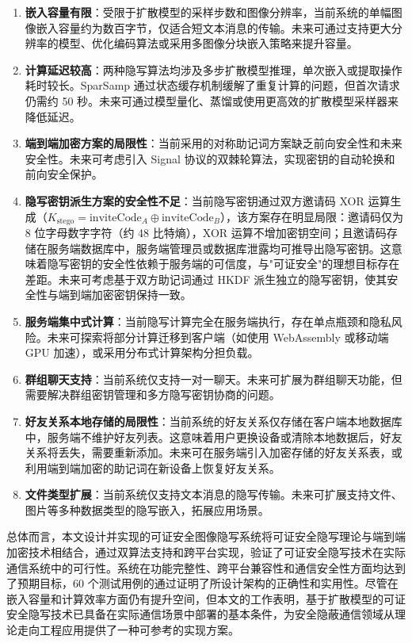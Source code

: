 \begin{enumerate}
    \item \textbf{嵌入容量有限}：受限于扩散模型的采样步数和图像分辨率，当前系统的单幅图像嵌入容量约为数百字节，仅适合短文本消息的传输。未来可通过支持更大分辨率的模型、优化编码算法或采用多图像分块嵌入策略来提升容量。

    \item \textbf{计算延迟较高}：两种隐写算法均涉及多步扩散模型推理，单次嵌入或提取操作耗时较长。SparSamp 通过状态缓存机制缓解了重复计算的问题，但首次请求仍需约 50 秒。未来可通过模型量化、蒸馏或使用更高效的扩散模型采样器来降低延迟。

    \item \textbf{端到端加密方案的局限性}：当前采用的对称助记词方案缺乏前向安全性和未来安全性。未来可考虑引入 Signal 协议的双棘轮算法，实现密钥的自动轮换和前向安全保护。

    \item \textbf{隐写密钥派生方案的安全性不足}：当前隐写密钥通过双方邀请码 XOR 运算生成（$K_{\text{stego}} = \text{inviteCode}_A \oplus \text{inviteCode}_B$），该方案存在明显局限：邀请码仅为 8 位字母数字字符（约 48 比特熵），XOR 运算不增加密钥空间；且邀请码存储在服务端数据库中，服务端管理员或数据库泄露均可推导出隐写密钥。这意味着隐写密钥的安全性依赖于服务端的可信度，与"可证安全"的理想目标存在差距。未来可考虑基于双方助记词通过 HKDF 派生独立的隐写密钥，使其安全性与端到端加密密钥保持一致。

    \item \textbf{服务端集中式计算}：当前隐写计算完全在服务端执行，存在单点瓶颈和隐私风险。未来可探索将部分计算迁移到客户端（如使用 WebAssembly 或移动端 GPU 加速），或采用分布式计算架构分担负载。

    \item \textbf{群组聊天支持}：当前系统仅支持一对一聊天。未来可扩展为群组聊天功能，但需要解决群组密钥管理和多方隐写密钥协商的问题。

    \item \textbf{好友关系本地存储的局限性}：当前系统的好友关系仅存储在客户端本地数据库中，服务端不维护好友列表。这意味着用户更换设备或清除本地数据后，好友关系将丢失，需要重新添加。未来可在服务端引入加密存储的好友关系表，或利用端到端加密的助记词在新设备上恢复好友关系。

    \item \textbf{文件类型扩展}：当前系统仅支持文本消息的隐写传输。未来可扩展支持文件、图片等多种数据类型的隐写嵌入，拓展应用场景。
\end{enumerate}

总体而言，本文设计并实现的可证安全图像隐写系统将可证安全隐写理论与端到端加密技术相结合，通过双算法支持和跨平台实现，验证了可证安全隐写技术在实际通信系统中的可行性。系统在功能完整性、跨平台兼容性和通信安全性方面均达到了预期目标，60 个测试用例的通过证明了所设计架构的正确性和实用性。尽管在嵌入容量和计算效率方面仍有提升空间，但本文的工作表明，基于扩散模型的可证安全隐写技术已具备在实际通信场景中部署的基本条件，为安全隐蔽通信领域从理论走向工程应用提供了一种可参考的实现方案。

